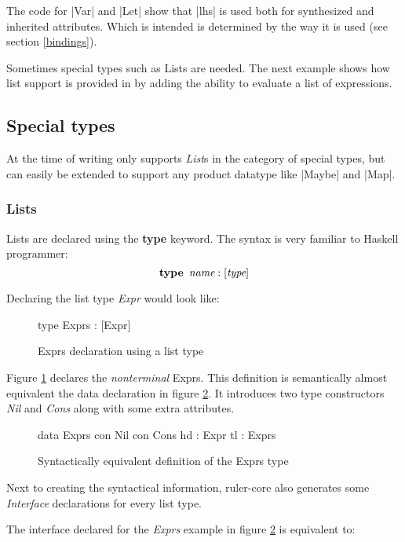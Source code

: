 The code for |Var| and |Let| show that |lhs| is used both for synthesized and inherited attributes. Which is intended is determined by the way it is used (see section \ref{bindings}).

Sometimes special types such as Lists are needed. The next example shows how list support is provided in \rcore by adding the ability to evaluate a list of expressions.

\subsection{Special types}
At the time of writing \rcore only supports \emph{List}s in the category of special types, but can easily be extended to support any product datatype like |Maybe| and |Map|.

\subsubsection{Lists}
Lists are declared using the \textbf{type} keyword. The syntax is very familiar to Haskell programmer: \[ \textbf{type} \hspace{5pt} \emph{name} : [\emph{type}] \]

Declaring the list type \emph{Expr} would look like:

\begin{figure}[H]
\begin{code}
type Exprs : [Expr]
\end{code}
\caption{Exprs declaration using a list type}
\label{type:exprs}
\end{figure}

Figure \ref{type:exprs} declares the \emph{nonterminal} Exprs. This definition is semantically almost equivalent the data declaration in figure \ref{type:lists}. It introduces two type constructors \emph{Nil} and \emph{Cons} along with some extra attributes.

\begin{figure}[H]
\begin{code}
data Exprs
  con Nil
  con Cons
    hd  : Expr
    tl  : Exprs
\end{code}
\caption{Syntactically equivalent definition of the Exprs type}
\label{type:lists}
\end{figure}

Next to creating the syntactical information, ruler-core also generates some \emph{Interface} declarations for every list type. 

The interface declared for the \emph{Exprs} example in figure \ref{type:lists} is equivalent to:

